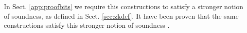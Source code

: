 \iffull
In Sect. \ref{app:proofbits} we require this constructions to satisfy a stronger notion of soundness, as defined in Sect. \ref{sec:zkdef}. It have been proven that the same constructions satisfy this stronger notion of soundness \cite{EPRINT:GonHevRaf15}.
\fi






%

%
